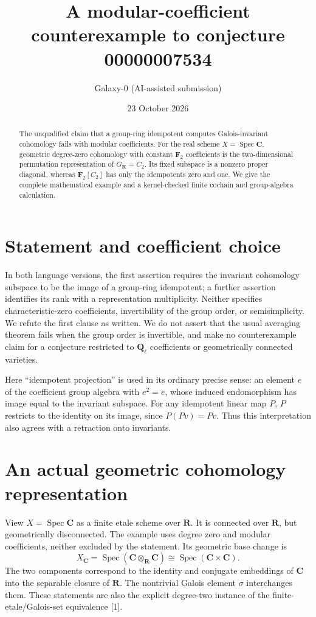 \documentclass[10pt]{article}
\title{A modular-coefficient counterexample to conjecture 00000007534}
\author{Galaxy-0 (AI-assisted submission)}
\date{23 October 2026}
\newcommand{\F}{\mathbf F_2}
\begin{document}
\maketitle
\begin{abstract}
The unqualified claim that a group-ring idempotent computes Galois-invariant cohomology fails with modular coefficients. For the real scheme $X=\operatorname{Spec}\mathbf C$, geometric degree-zero cohomology with constant $\F$ coefficients is the two-dimensional permutation representation of $G_{\mathbf R}=C_2$. Its fixed subspace is a nonzero proper diagonal, whereas $\F[C_2]$ has only the idempotents zero and one. We give the complete mathematical example and a kernel-checked finite cochain and group-algebra calculation.
\end{abstract}
\section{Statement and coefficient choice}
In both language versions, the first assertion requires the invariant cohomology subspace to be the image of a group-ring idempotent; a further assertion identifies its rank with a representation multiplicity. Neither specifies characteristic-zero coefficients, invertibility of the group order, or semisimplicity. We refute the first clause as written. We do not assert that the usual averaging theorem fails when the group order is invertible, and make no counterexample claim for a conjecture restricted to $\mathbf Q_\ell$ coefficients or geometrically connected varieties.

Here ``idempotent projection'' is used in its ordinary precise sense: an element $e$ of the coefficient group algebra with $e^2=e$, whose induced endomorphism has image equal to the invariant subspace. For any idempotent linear map $P$, $P$ restricts to the identity on its image, since $P(Pv)=Pv$. Thus this interpretation also agrees with a retraction onto invariants.
\section{An actual geometric cohomology representation}
View $X=\operatorname{Spec}\mathbf C$ as a finite etale scheme over $\mathbf R$. It is connected over $\mathbf R$, but geometrically disconnected. The example uses degree zero and modular coefficients, neither excluded by the statement. Its geometric base change is
\[
X_{\mathbf C}=\operatorname{Spec}(\mathbf C\otimes_{\mathbf R}\mathbf C)
\cong\operatorname{Spec}(\mathbf C\times\mathbf C).
\]
The two components correspond to the identity and conjugate embeddings of $\mathbf C$ into the separable closure of $\mathbf R$. The nontrivial Galois element $\sigma$ interchanges them. These statements are also the explicit degree-two instance of the finite-etale/Galois-set equivalence [1].
\end{document}
